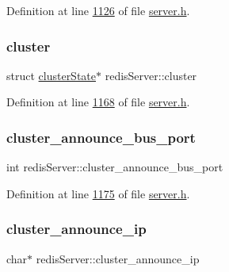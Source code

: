 Definition at line \hyperlink{server_8h_source_l01126}{1126} of file \hyperlink{server_8h_source}{server.\+h}.

\mbox{\label{structredisServer_a6dce12de9ec721fd3d526e97a46bb626}} 
\subsubsection{\texorpdfstring{cluster}{cluster}}
{\footnotesize\ttfamily struct \hyperlink{structclusterState}{cluster\+State}$\ast$ redis\+Server\+::cluster}



Definition at line \hyperlink{server_8h_source_l01168}{1168} of file \hyperlink{server_8h_source}{server.\+h}.

\mbox{\label{structredisServer_a3390e9f2dac478100b2ac82ed692d046}} 
\subsubsection{\texorpdfstring{cluster\+\_\+announce\+\_\+bus\+\_\+port}{cluster\_announce\_bus\_port}}
{\footnotesize\ttfamily int redis\+Server\+::cluster\+\_\+announce\+\_\+bus\+\_\+port}



Definition at line \hyperlink{server_8h_source_l01175}{1175} of file \hyperlink{server_8h_source}{server.\+h}.

\mbox{\label{structredisServer_a4b7a2a92e13c091a7256d832942b4169}} 
\subsubsection{\texorpdfstring{cluster\+\_\+announce\+\_\+ip}{cluster\_announce\_ip}}
{\footnotesize\ttfamily char$\ast$ redis\+Server\+::cluster\+\_\+announce\+\_\+ip}




